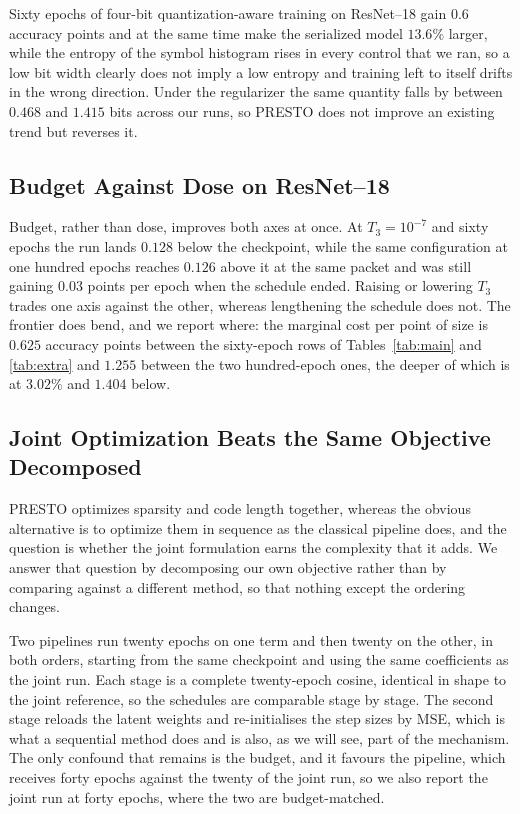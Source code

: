 \documentclass{article}
\begin{document}
Sixty epochs of four-bit quantization-aware training on ResNet--18 gain $0.6$
accuracy points and at the same time make the serialized model $13.6\%$ larger,
while the entropy of the symbol histogram rises in every control that we ran, so
a low bit width clearly does not imply a low entropy and training left to itself
drifts in the wrong direction. Under the regularizer the same quantity falls by
between $0.468$ and $1.415$ bits across our runs, so PRESTO does not improve an
existing trend but reverses it.


\subsection{Budget Against Dose on ResNet--18}
\label{app:budget}

Budget, rather than dose, improves both axes at once. At $T_3=10^{-7}$ and sixty
epochs the run lands $0.128$ below the checkpoint, while the same configuration
at one hundred epochs reaches $0.126$ above it at the same packet and was still
gaining $0.03$ points per epoch when the schedule ended. Raising or lowering
$T_3$ trades one axis against the other, whereas lengthening the schedule does
not. The frontier does bend, and we report where: the marginal cost per point of size
is $0.625$ accuracy points between the sixty-epoch rows of
Tables~\ref{tab:main} and \ref{tab:extra} and $1.255$ between the two
hundred-epoch ones, the deeper of which is at $3.02\%$ and $1.404$ below.


\subsection{Joint Optimization Beats the Same Objective Decomposed}
\label{sec:pipeline}

PRESTO optimizes sparsity and code length together, whereas the obvious
alternative is to optimize them in sequence as the classical pipeline does, and
the question is whether the joint formulation earns the complexity that it adds.
We answer that question by decomposing our own objective rather than by comparing
against a different method, so that nothing except the ordering changes.

Two pipelines run twenty epochs on one term and then twenty on the other, in both
orders, starting from the same checkpoint and using the same coefficients as the
joint run. Each stage is a complete twenty-epoch cosine, identical in shape to the
joint reference, so the schedules are comparable stage by stage. The second stage
reloads the latent weights and re-initialises the step sizes by MSE, which is what
a sequential method does and is also, as we will see, part of the mechanism. The
only confound that remains is the budget, and it favours the pipeline, which
receives forty epochs against the twenty of the joint run, so we also report the
joint run at forty epochs, where the two are budget-matched.
\end{document}
